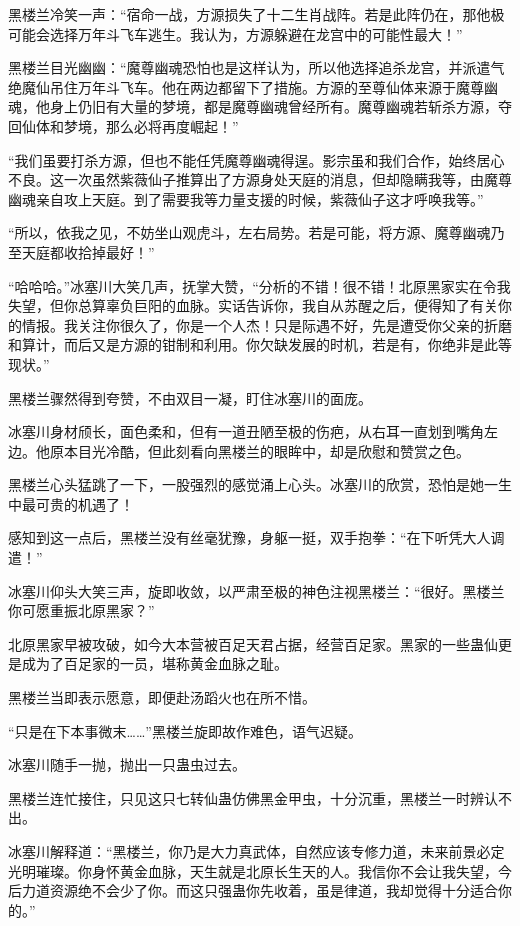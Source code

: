 \begin{this_body}
黑楼兰冷笑一声：“宿命一战，方源损失了十二生肖战阵。若是此阵仍在，那他极可能会选择万年斗飞车逃生。我认为，方源躲避在龙宫中的可能性最大！”

黑楼兰目光幽幽：“魔尊幽魂恐怕也是这样认为，所以他选择追杀龙宫，并派遣气绝魔仙吊住万年斗飞车。他在两边都留下了措施。方源的至尊仙体来源于魔尊幽魂，他身上仍旧有大量的梦境，都是魔尊幽魂曾经所有。魔尊幽魂若斩杀方源，夺回仙体和梦境，那么必将再度崛起！”

“我们虽要打杀方源，但也不能任凭魔尊幽魂得逞。影宗虽和我们合作，始终居心不良。这一次虽然紫薇仙子推算出了方源身处天庭的消息，但却隐瞒我等，由魔尊幽魂亲自攻上天庭。到了需要我等力量支援的时候，紫薇仙子这才呼唤我等。”

“所以，依我之见，不妨坐山观虎斗，左右局势。若是可能，将方源、魔尊幽魂乃至天庭都收拾掉最好！”

“哈哈哈。”冰塞川大笑几声，抚掌大赞，“分析的不错！很不错！北原黑家实在令我失望，但你总算辜负巨阳的血脉。实话告诉你，我自从苏醒之后，便得知了有关你的情报。我关注你很久了，你是一个人杰！只是际遇不好，先是遭受你父亲的折磨和算计，而后又是方源的钳制和利用。你欠缺发展的时机，若是有，你绝非是此等现状。”

黑楼兰骤然得到夸赞，不由双目一凝，盯住冰塞川的面庞。

冰塞川身材颀长，面色柔和，但有一道丑陋至极的伤疤，从右耳一直划到嘴角左边。他原本目光冷酷，但此刻看向黑楼兰的眼眸中，却是欣慰和赞赏之色。

黑楼兰心头猛跳了一下，一股强烈的感觉涌上心头。冰塞川的欣赏，恐怕是她一生中最可贵的机遇了！

感知到这一点后，黑楼兰没有丝毫犹豫，身躯一挺，双手抱拳：“在下听凭大人调遣！”

冰塞川仰头大笑三声，旋即收敛，以严肃至极的神色注视黑楼兰：“很好。黑楼兰你可愿重振北原黑家？”

北原黑家早被攻破，如今大本营被百足天君占据，经营百足家。黑家的一些蛊仙更是成为了百足家的一员，堪称黄金血脉之耻。

黑楼兰当即表示愿意，即便赴汤蹈火也在所不惜。

“只是在下本事微末……”黑楼兰旋即故作难色，语气迟疑。

冰塞川随手一抛，抛出一只蛊虫过去。

黑楼兰连忙接住，只见这只七转仙蛊仿佛黑金甲虫，十分沉重，黑楼兰一时辨认不出。

冰塞川解释道：“黑楼兰，你乃是大力真武体，自然应该专修力道，未来前景必定光明璀璨。你身怀黄金血脉，天生就是北原长生天的人。我信你不会让我失望，今后力道资源绝不会少了你。而这只强蛊你先收着，虽是律道，我却觉得十分适合你的。”


\end{this_body}
